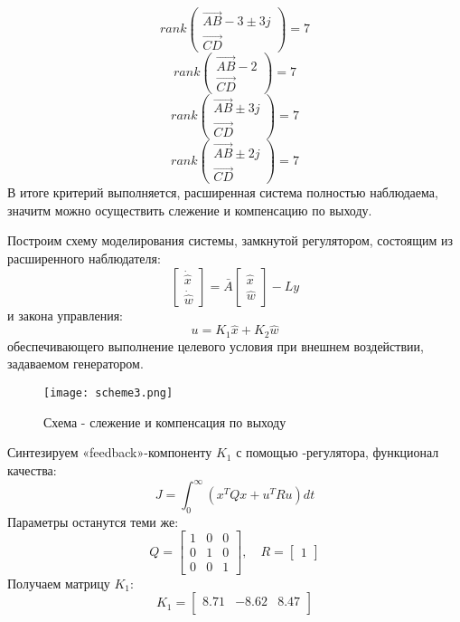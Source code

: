 $$
    rank \begin{pmatrix}
        \vec{AB} - 3\pm 3j \\ \vec{CD}
    \end{pmatrix} = 7 
$$
$$
    rank \begin{pmatrix}
        \vec{AB} - 2 \\ \vec{CD}
    \end{pmatrix} = 7 
$$
$$
    rank \begin{pmatrix}
        \vec{AB} \pm 3j \\ \vec{CD}
    \end{pmatrix} = 7 
$$
$$
    rank \begin{pmatrix}
        \vec{AB} \pm 2j \\ \vec{CD}
    \end{pmatrix} = 7 
$$
В итоге критерий выполняется,  расширенная система полностью наблюдаема, значитм можно 
осуществить слежение и компенсацию по выходу.



Построим схему моделирования системы,  замкнутой регулятором, состоящим из расширенного наблюдателя:
$$
    \begin{bmatrix}
      \dot{\hat{x}} \\ \dot{\hat{w}}
    \end{bmatrix} = \bar{A} 
                      \begin{bmatrix}
                        \hat{x} \\ \hat{w}
                      \end{bmatrix}
                      - Ly
$$
и закона управления:
$$
   u = K_1 \hat{x} + K_2 \hat{w}
$$
обеспечивающего выполнение целевого условия  при внешнем воздействии, задаваемом генератором.

\begin{figure}[ht]
  \centering
  \texttt{[image: scheme3.png]}
  \caption{Схема - слежение и компенсация по выходу}
\end{figure}


Синтезируем «feedback»-компоненту $K_1$ с помощью -регулятора, функционал качества:
$$
  J = \int_0^{\infty} (x^TQx + u^TRu) dt
$$ 
Параметры останутся теми же:
$$
  Q = \begin{bmatrix}
    1 & 0 & 0 \\
    0 & 1 & 0 \\
    0 & 0 & 1
  \end{bmatrix}, \quad R = \begin{bmatrix}
    1
  \end{bmatrix}
$$
Получаем матрицу $K_1$:
$$
  K_1 = \begin{bmatrix}
    8.71 & -8.62 & 8.47 \\
\end{bmatrix}
$$

